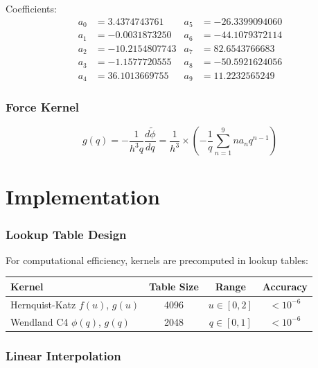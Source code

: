 \documentclass[12pt]{article}
\begin{document}
Coefficients:
\begin{align}
a_0 &= 3.4374743761 & a_5 &= -26.3399094060 \\
a_1 &= -0.0031873250 & a_6 &= -44.1079372114 \\
a_2 &= -10.2154807743 & a_7 &= 82.6543766683 \\
a_3 &= -1.1577720555 & a_8 &= -50.5921624056 \\
a_4 &= 36.1013669755 & a_9 &= 11.2232565249
\end{align}

\section{Force Kernel}

\begin{equation}
g(q) = -\frac{1}{h^3 q} \frac{d\tilde{\phi}}{dq} = \frac{1}{h^3} \times \left(-\frac{1}{q}\sum_{n=1}^{9} n a_n q^{n-1}\right)
\end{equation}

\part{Implementation}

\section{Lookup Table Design}

For computational efficiency, kernels are precomputed in lookup tables:

\begin{table}[h]
\centering
\begin{tabular}{lccc}
\toprule
\textbf{Kernel} & \textbf{Table Size} & \textbf{Range} & \textbf{Accuracy} \\
\midrule
Hernquist-Katz $f(u)$, $g(u)$ & 4096 & $u \in [0, 2]$ & $< 10^{-6}$ \\
Wendland C4 $\phi(q)$, $g(q)$ & 2048 & $q \in [0, 1]$ & $< 10^{-6}$ \\
\bottomrule
\end{tabular}
\end{table}

\section{Linear Interpolation}
\end{document}
